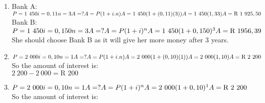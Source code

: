 \begin{solutions}{}
{\begin{enumerate}[itemsep=5pt, label=\textbf{\arabic*}. ]
\begin{multicols}{2}
\begin{enumerate}[noitemsep, label=\textbf{(\alph*)} ]
 \item  $P = 500\\
i=0,04\\
n=1\\
A=?\\
A=P(1 + i)^{n}\\
A = 500(1 + 0,04)^{1}\\
A = \text{R }520$
	\end{enumerate}
\end{multicols}
\item Bank A:\\
$P=1~450\\
i=0,11\\
n=3\\
A=?\\
 A=P(1 + i . n) \\
A = 1~450(1+ (0,11)(3))\\
A = 1~450(1,33)\\
A = \text{R }1~925,50$\\
Bank B:\\
 $P = 1~450\\
i=0,150\\
n=3\\
A=?\\
A=P(1 + i)^{n}\\
A = 1~450(1 + 0,150)^{3}\\
A = \text{R }1956,39$\\
She should choose Bank B as it will give her more money after 3 years.
\item $P=2~000\\
i=0,10\\
n=1\\
A=?\\
 A=P(1 + i . n) \\
A = 2~000(1+ (0,10)(1))\\
A = 2~000(1,10)\\
A = \text{R }2~200$\\
So the amount of interest is:\\
$2~200 - 2~000 = \text{R }200$
\item  $P = 2~000\\
i=0,10\\
n=1\\
A=?\\
A=P(1 + i)^{n}\\
A = 2~000(1 + 0,10)^{1}\\
A = \text{R }2~200$\\
So the amount of interest is:\\

\end{enumerate}}
\end{solutions}
